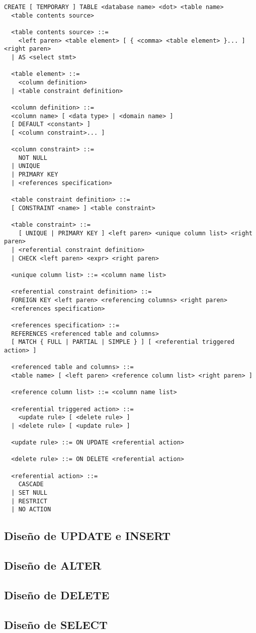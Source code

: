 \begin{Verbatim}[frame=single, label=sintaxis para CREATE TABLE]
  CREATE [ TEMPORARY ] TABLE <database name> <dot> <table name> 
  <table contents source>

  <table contents source> ::=
    <left paren> <table element> [ { <comma> <table element> }... ] <right paren>
  | AS <select stmt>
  
  <table element> ::=
    <column definition>
  | <table constraint definition>

  <column definition> ::=
  <column name> [ <data type> | <domain name> ]
  [ DEFAULT <constant> ]
  [ <column constraint>... ]
  
  <column constraint> ::=
    NOT NULL
  | UNIQUE
  | PRIMARY KEY
  | <references specification>

  <table constraint definition> ::=
  [ CONSTRAINT <name> ] <table constraint>

  <table constraint> ::=
    [ UNIQUE | PRIMARY KEY ] <left paren> <unique column list> <right paren>
  | <referential constraint definition>
  | CHECK <left paren> <expr> <right paren>

  <unique column list> ::= <column name list>

  <referential constraint definition> ::=
  FOREIGN KEY <left paren> <referencing columns> <right paren>
  <references specification>
  
  <references specification> ::=
  REFERENCES <referenced table and columns>
  [ MATCH { FULL | PARTIAL | SIMPLE } ] [ <referential triggered action> ]

  <referenced table and columns> ::=
  <table name> [ <left paren> <reference column list> <right paren> ]

  <reference column list> ::= <column name list>

  <referential triggered action> ::=
    <update rule> [ <delete rule> ]
  | <delete rule> [ <update rule> ]

  <update rule> ::= ON UPDATE <referential action>

  <delete rule> ::= ON DELETE <referential action>

  <referential action> ::=
    CASCADE
  | SET NULL
  | RESTRICT
  | NO ACTION

\end{Verbatim}

\subsection{Diseño de UPDATE e INSERT}

\subsection{Diseño de ALTER}

\subsection{Diseño de DELETE}

\subsection{Diseño de SELECT}

